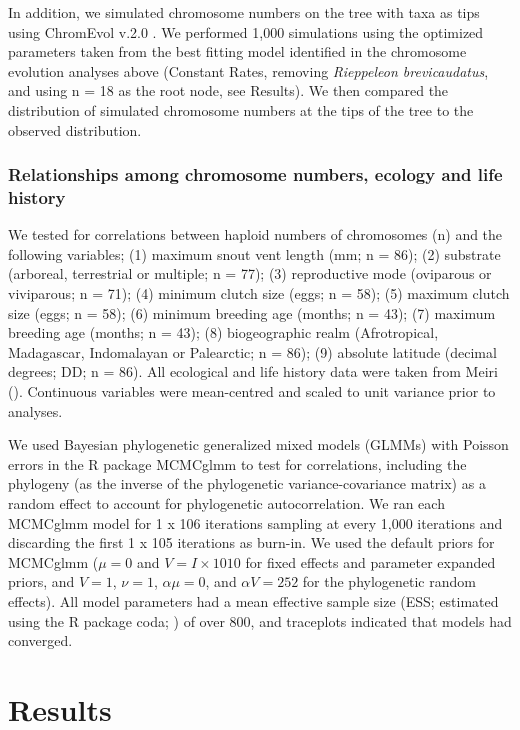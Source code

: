 \documentclass[a4paper, 12pt]{article}
\begin{document}
In addition, we simulated chromosome numbers on the tree with taxa as tips using ChromEvol v.2.0 \citep{glick2014chromevol,mayrose2010probabilistic}. 
We performed 1,000 simulations using the optimized parameters taken from the best fitting model identified in the chromosome evolution analyses above (Constant Rates, removing \textit{Rieppeleon brevicaudatus}, and using n = 18 as the root node, see Results). 
We then compared the distribution of simulated chromosome numbers at the tips of the tree to the observed distribution. 

\subsubsection{Relationships among chromosome numbers, ecology and life history}
We tested for correlations between haploid numbers of chromosomes (n) and the following variables; (1) maximum snout vent length (mm; n = 86); (2) substrate (arboreal, terrestrial or multiple; n = 77); (3) reproductive mode (oviparous or viviparous; n = 71); (4) minimum clutch size (eggs; n = 58); (5) maximum clutch size (eggs; n = 58); (6) minimum breeding age (months; n = 43); (7) maximum breeding age (months; n = 43); (8) biogeographic realm (Afrotropical, Madagascar, Indomalayan or Palearctic; n = 86); (9) absolute latitude (decimal degrees; DD; n = 86). 
All ecological and life history data were taken from Meiri (\citeyear{meiri2018traits}). 
Continuous variables were mean-centred and scaled to unit variance prior to analyses.

We used Bayesian phylogenetic generalized mixed models (GLMMs) with Poisson errors in the R package MCMCglmm \citep{hadfield2010mcmc} to test for correlations, including the phylogeny (as the inverse of the phylogenetic variance-covariance matrix) as a random effect to account for phylogenetic autocorrelation. 
We ran each MCMCglmm model for 1 x 106 iterations sampling at every 1,000 iterations and discarding the first 1 x 105 iterations as burn-in. 
We used the default priors for MCMCglmm ($\mu = 0$ and $V = I × 1010$ for fixed effects and parameter expanded priors, and $V = 1$, $\nu = 1$, $\alpha \mu = 0$, and $\alpha V = 252$ for the phylogenetic random effects). 
All model parameters had a mean effective sample size (ESS; estimated using the R package coda; \citealt{plummer2006coda}) of over 800, and traceplots indicated that models had converged.

\section{Results}
\end{document}
